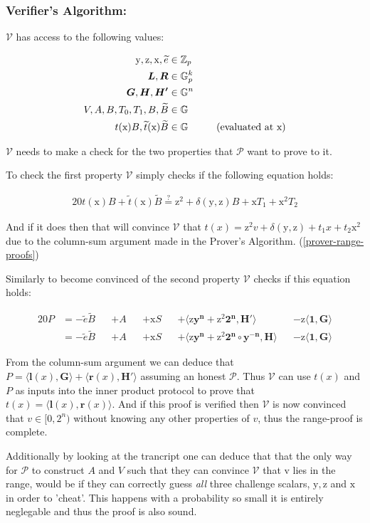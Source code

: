 \documentclass{article}
\newcommand{\eq}[1]{\begin{alignat*}{20}#1\end{alignat*}}
\newcommand{\eqn}[2]{\begin{equation}\label{#1}\begin{split}#2\end{split}\end{equation}}
\renewcommand{\vec}[1]{\boldsymbol{#1}}
\newcommand{\ran}[1]{\mathrm{#1}}
\newcommand{\vecran}[1]{\mathbf{#1}}
\newcommand{\V}{\mathcal{V}}
\renewcommand{\P}{\mathcal{P}}
\newcommand{\G}{\mathbb{G}}
\newcommand{\Z}{\mathbb{Z}}
\newcommand{\dotp}[2]{\langle #1, #2 \rangle}
\newcommand{\tB}{\widetilde{B}}
\renewcommand{\tt}{\widetilde{t}}
\begin{document}
\subsubsection{Verifier's Algorithm:} \label{verifier-range-proof}

$\V$ has access to the following values:

\eqn{def1-ver}{
	\ran{y}, \ran{z}, \ran{x}, \widetilde{e} &\in \Z_p \\
	\vec{L}, \vec{R} &\in \G_p^{k} \\
	\vec{G}, \vec{H}, \vec{H'} &\in \G^n \\
	V, A, B, T_0, T_1, B, \tB &\in \G \\
	t(\ran{x})B, \tt(\ran{x})\tB &\in \G \hspace*{1cm} \text{(evaluated at x)}
}

$\V$ needs to make a check for the two properties that $\P$ want to prove to it.

To check the first property $\V$ simply checks if the following equation holds:

\eq{
	t(\ran{x})B + \tt(\ran{x})\tB \stackrel{?}{=} \ran{z^2} + \delta(\ran{y},\ran{z})B + \ran{x}T_1 + \ran{x^2}T_2
}

And if it does then that will convince $\V$ that $t(x) = \ran{z^2}v + \delta(\ran{y},\ran{z}) + t_1x + t_2\ran{x^2}$ due to the column-sum argument made in the Prover's Algorithm. (\ref{prover-range-proofs})

Similarly to become convinced of the second property $\V$ checks if this equation holds:

\eq{
	P &= -\widetilde{e}\tB &&+ A &&+ \ran{x}S &&+ \dotp{\ran{z}\vecran{y^n} + \ran{z^2}\vec{2^n}}{\vec{H'}} &&- \ran{z}\dotp{\vec{1}}{\vec{\vec{G}}} \\
	&= -\widetilde{e}\tB &&+ A &&+ \ran{x}S &&+ \dotp{\ran{z}\vecran{y^n} + \ran{z^2}\vec{2^n}\circ\vecran{y^{-n}}}{\vec{H}} &&- \ran{z}\dotp{\vec{1}}{\vec{G}}
}

From the column-sum argument we can deduce that $P = \dotp{\vec{l}(x)}{\vec{G}} + \dotp{\vec{r}(x)}{\vec{H'}}$ assuming an honest $\P$. Thus $\V$ can use $t(x)$ and $P$ as inputs into the inner product protocol to prove that $ t(x) = \dotp{\vec{l}(x)}{\vec{r}(x)}$. And if this proof is verified then $\V$ is now convinced that $v\in [0,2^n)$ without knowing any other properties of $v$, thus the range-proof is complete.

Additionally by looking at the trancript one can deduce that that the only way for $\P$ to construct $A$ and $V$ such that they can convince $\V$ that v lies in the range, would be if they can correctly guess \textit{all} three challenge scalars, $\ran{y}, \ran{z}$ and $\ran{x}$ in order to 'cheat'. This happens with a probability so small it is entirely neglegable and thus the proof is also sound.
\end{document}
